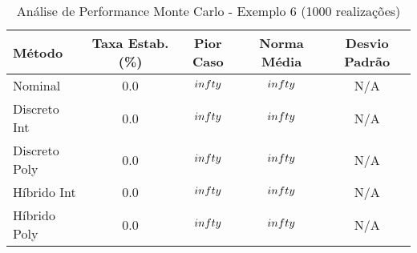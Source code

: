 \begin{table}[htbp]
\centering
\caption{Análise de Performance Monte Carlo - Exemplo 6 (1000 realizações)}
\label{tab:performance_ex6}
\begin{tabular}{lcccc}
\hline
Método & Taxa Estab. (\%) & Pior Caso & Norma Média & Desvio Padrão \\
\hline
Nominal & 0.0 & $\\infty$ & $\\infty$ & N/A \\
Discreto Int & 0.0 & $\\infty$ & $\\infty$ & N/A \\
Discreto Poly & 0.0 & $\\infty$ & $\\infty$ & N/A \\
Híbrido Int & 0.0 & $\\infty$ & $\\infty$ & N/A \\
Híbrido Poly & 0.0 & $\\infty$ & $\\infty$ & N/A \\
\hline
\end{tabular}
\end{table}

